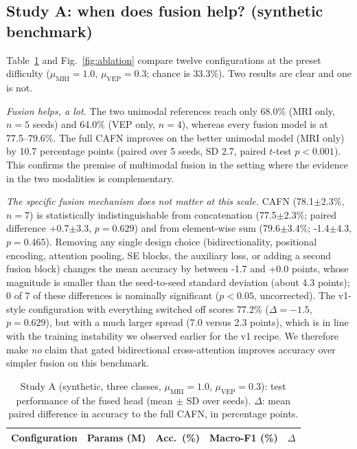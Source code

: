 \subsection{Study A: when does fusion help? (synthetic benchmark)}\label{sec:studyA}
Table~\ref{tab:ablation} and Fig.~\ref{fig:ablation} compare twelve configurations at the preset difficulty ($\mu_{\mathrm{MRI}}{=}1.0$, $\mu_{\mathrm{VEP}}{=}0.3$; chance is 33.3\%). Two results are clear and one is not.

\emph{Fusion helps, a lot.} The two unimodal references reach only 68.0\% (MRI only, $n{=}5$ seeds) and 64.0\% (VEP only, $n{=}4$), whereas every fusion model is at 77.5--79.6\%. The full CAFN improves on the better unimodal model (MRI only) by 10.7 percentage points (paired over 5 seeds, SD 2.7, paired $t$-test $p<0.001$). This confirms the premise of multimodal fusion in the setting where the evidence in the two modalities is complementary.

\emph{The specific fusion mechanism does not matter at this scale.} CAFN (78.1$\pm$2.3\%, $n{=}7$) is statistically indistinguishable from concatenation (77.5$\pm$2.3\%; paired difference +0.7$\pm$3.3, $p=0.629$) and from element-wise sum (79.6$\pm$3.4\%; -1.4$\pm$4.3, $p=0.465$). Removing any single design choice (bidirectionality, positional encoding, attention pooling, SE blocks, the auxiliary loss, or adding a second fusion block) changes the mean accuracy by between -1.7 and +0.0 points, whose magnitude is smaller than the seed-to-seed standard deviation (about 4.3 points); 0 of 7 of these differences is nominally significant ($p<0.05$, uncorrected). The v1-style configuration with everything switched off scores 77.2\% ($\Delta=-1.5$, $p=0.629$), but with a much larger spread (7.0 versus 2.3 points), which is in line with the training instability we observed earlier for the v1 recipe. We therefore make \emph{no} claim that gated bidirectional cross-attention improves accuracy over simpler fusion on this benchmark.

\begin{table}[!t]
\caption{Study A (synthetic, three classes, $\mu_{\mathrm{MRI}}{=}1.0$, $\mu_{\mathrm{VEP}}{=}0.3$): test performance of the fused head (mean $\pm$ SD over seeds). $\Delta$: mean paired difference in accuracy to the full CAFN, in percentage points.}
\label{tab:ablation}
\centering\scriptsize\setlength{\tabcolsep}{2.5pt}
\begin{tabular}{@{}lcccc@{}}
\toprule
Configuration & Params (M) & Acc.\ (\%) & Macro-F1 (\%) & $\Delta$\\
\midrule

\bottomrule
\end{tabular}
\end{table}

